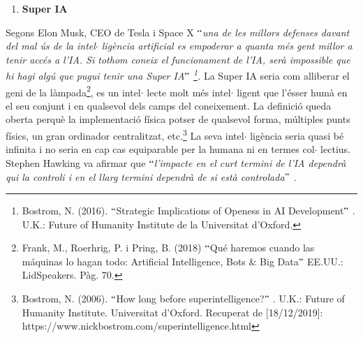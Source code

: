 \documentclass[12pt]{article}
\begin{document}
\begin{enumerate}
\vspace{\baselineskip}
\begin{justify}
Hi ha altres tests com el del $``$Café$"$ , proposat pel President de la Societat de Intel$ \cdot $ ligència Artificial General dels Estats Units, Ben Goertzel\footnote{ Frank, M., Roerhrig, P. i Pring, B. (2018) $``$Qué haremos cuando las máquinas lo hagan todo: Artificial Intelligence, Bots $\&$  Big Data$"$  EE.UU.: LidSpeakers. Pàg. 69. }, que considera que es podrà parlar d’IAF quan una màquina sigui capaç d’entrar a casa d’una persona i seguir tots els passos per a fer cafè. Pels essers humans és molt senzill, però per una màquina és extremament complexa. Encara hem construït aquesta tipologia d’intel$ \cdot $ ligència,  perquè suposaria que pot automillorar-se assumint noves funcions autònomament per les quals no ha estat entrenat i per tant, crear noves eines de forma il$ \cdot $ limitada. 
\end{justify}\par


\vspace{\baselineskip}
	\item \textbf{Super IA}
\end{enumerate}\par


\vspace{\baselineskip}
\begin{justify}
Segons Elon Musk, CEO de Tesla i Space X \textit{$``$una de les millors defenses davant del mal ús de la intel$ \cdot $ ligència artificial es empoderar a quanta més gent millor a tenir accés a l’IA. Si tothom coneix el funcionament de l’IA, serà impossible que hi hagi algú que pugui tenir una Super IA$"$ \footnote{  Bostrom, N. (2016). $``$Strategic Implications of Openess in AI Development$"$ . U.K.: Future of Humanity Institute de la Universitat d’Oxford. }. }La Super IA seria com alliberar el geni de la làmpada\footnote{ Frank, M., Roerhrig, P. i Pring, B. (2018) $``$Qué haremos cuando las máquinas lo hagan todo: Artificial Intelligence, Bots $\&$  Big Data$"$  EE.UU.: LidSpeakers. Pàg. 70. }, es un intel$ \cdot $ lecte molt més intel$ \cdot $ ligent que l’ésser humà en el seu conjunt i en qualsevol dels camps del coneixement. La definició queda oberta perquè la implementació física potser de qualsevol forma, múltiples punts físics, un gran ordinador centralitzat, etc.\footnote{ Bostrom, N. (2006). $``$How long before superintelligence?$"$ . U.K.: Future of Humanity Institute. Universitat d’Oxford. Recuperat de [18/12/2019]: https://www.nickbostrom.com/superintelligence.html  } La seva intel$ \cdot $ ligència seria quasi bé infinita i no seria en cap cas equiparable per la humana ni en termes col$ \cdot $ lectius. Stephen Hawking va afirmar que \textit{$``$l’impacte en el curt termini de l’IA dependrà qui la controli i en el llarg termini dependrà de si està controlada$"$ . }
\end{justify}\par
\end{document}
